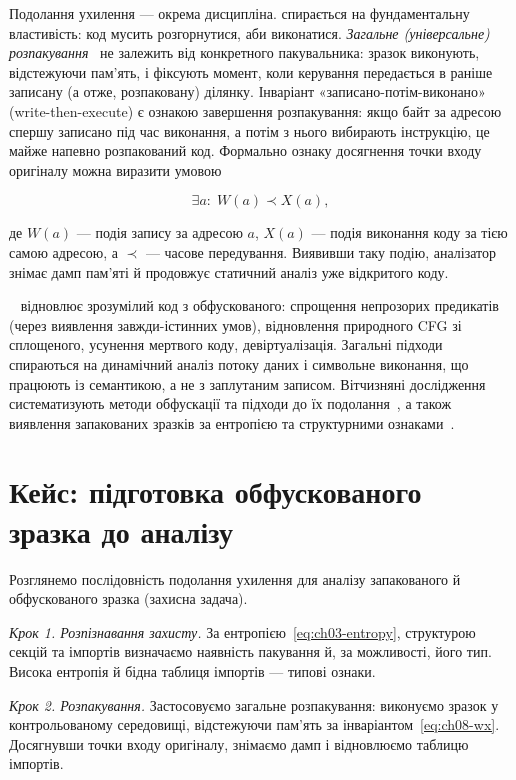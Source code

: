 Подолання ухилення --- окрема дисципліна.  спирається на фундаментальну властивість: код мусить розгорнутися, аби виконатися. \emph{Загальне (універсальне) розпакування}~\cite{ch08:royal,ch08:guo} не залежить від конкретного пакувальника: зразок виконують, відстежуючи пам'ять, і фіксують момент, коли керування передається в раніше записану (а отже, розпаковану) ділянку. Інваріант «записано-потім-виконано» (write-then-execute) є ознакою завершення розпакування: якщо байт за адресою спершу записано під час виконання, а потім з нього вибирають інструкцію, це майже напевно розпакований код. Формально ознаку досягнення точки входу оригіналу можна виразити умовою

\begin{equation}
\exists a:\; W(a) \prec X(a),
\label{eq:ch08-wx}
\end{equation}

де $W(a)$ --- подія запису за адресою $a$, $X(a)$ --- подія виконання коду за тією самою адресою, а $\prec$ --- часове передування. Виявивши таку подію, аналізатор знімає дамп пам'яті й продовжує статичний аналіз уже відкритого коду.

~\cite{ch08:yadegari} відновлює зрозумілий код з обфускованого: спрощення непрозорих предикатів (через виявлення завжди-істинних умов), відновлення природного CFG зі сплощеного, усунення мертвого коду, девіртуалізація. Загальні підходи спираються на динамічний аналіз потоку даних і символьне виконання, що працюють із семантикою, а не з заплутаним записом. Вітчизняні дослідження систематизують методи обфускації та підходи до їх подолання~\cite{ch08:obfusc-ua}, а також виявлення запакованих зразків за ентропією та структурними ознаками~\cite{ch08:packer-ua}.

\section{Кейс: підготовка обфускованого зразка до аналізу}\label{sec:ch08-case}

Розглянемо послідовність подолання ухилення для аналізу запакованого й обфускованого зразка (захисна задача).

\emph{Крок 1. Розпізнавання захисту.} За ентропією~\eqref{eq:ch03-entropy}, структурою секцій та імпортів визначаємо наявність пакування й, за можливості, його тип. Висока ентропія й бідна таблиця імпортів --- типові ознаки.

\emph{Крок 2. Розпакування.} Застосовуємо загальне розпакування: виконуємо зразок у контрольованому середовищі, відстежуючи пам'ять за інваріантом~\eqref{eq:ch08-wx}. Досягнувши точки входу оригіналу, знімаємо дамп і відновлюємо таблицю імпортів.

